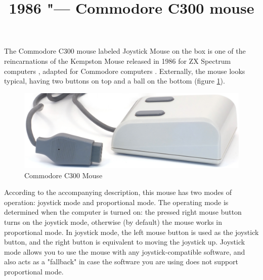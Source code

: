 \documentclass[11pt, a4paper]{article}
\begin{document}
\title{1986 "--- Commodore C300 mouse}
\date{}
\maketitle
{}
The Commodore C300 mouse labeled Joystick Mouse on the box is one of the reincarnations of the Kempston Mouse released in 1986 for ZX Spectrum computers \cite{SinclairUser}, adapted for Commodore computers \cite{c64wiki}. Externally, the mouse looks typical, having two buttons on top and a ball on the bottom (figure \ref{fig:C300Pic}).

\begin{figure}[h]
    \centering
    \includegraphics[scale=0.7]{1986_commodore_c300_mouse/cmnirm_30.jpg}
    \caption{Commodore C300 Mouse}
    \label{fig:C300Pic}
\end{figure}

According to the accompanying description, this mouse has two modes of operation: joystick mode and proportional mode. The operating mode is determined when the computer is turned on: the pressed right mouse button turns on the joystick mode, otherwise (by default) the mouse works in proportional mode. In joystick mode, the left mouse button is used as the joystick button, and the right button is equivalent to moving the joystick up. Joystick mode allows you to use the mouse with any joystick-compatible software, and also acts as a "fallback" in case the software you are using does not support proportional mode.
\end{document}
